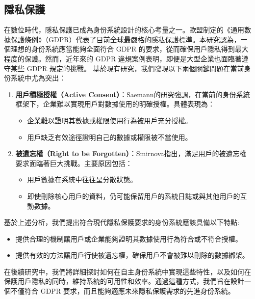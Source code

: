 \subsection{隱私保護}
在數位時代，隱私保護已成為身份系統設計的核心考量之一。歐盟制定的《通用數據保護條例》（GDPR）代表了目前全球最嚴格的隱私保護標準。本研究認為，一個理想的身份系統應當能夠全面符合 GDPR 的要求，從而確保用戶隱私得到最大程度的保護。然而，近年來的 GDPR 違規案例表明，即便是大型企業也面臨著遵守某些 GDPR 規定的挑戰。
基於現有研究，我們發現以下兩個關鍵問題在當前身份系統中尤為突出：
\begin{enumerate}
  \item \textbf{用戶積極授權（Active Consent）}：Saemann\cite{saemann2022investigating}的研究強調，在當前的身份系統框架下，企業難以實現用戶對數據使用的明確授權。具體表現為：
        \begin{itemize}
          \item 企業難以證明其數據或權限使用行為被用戶充分授權。
          \item 用戶缺乏有效途徑證明自己的數據或權限被不當使用。
        \end{itemize}
  \item \textbf{被遺忘權（Right to be Forgotten）}：Smirnova\cite{smirnova2024understanding}指出，滿足用戶的被遺忘權要求面臨著巨大挑戰。主要原因包括：
        \begin{itemize}
          \item 用戶數據在系統中往往呈分散狀態。
          \item 即使刪除核心用戶的資料，仍可能保留用戶的系統日誌或與其他用戶的互動數據。
        \end{itemize}
\end{enumerate}
基於上述分析，我們提出符合現代隱私保護要求的身份系統應該具備以下特點:
\begin{itemize}
  \item 提供合理的機制讓用戶或企業能夠證明其數據使用行為符合或不符合授權。
  \item 提供有效的方法讓用戶行使被遺忘權，確保用戶不會被難以刪除的數據綁架。
\end{itemize}
在後續研究中，我們將詳細探討如何在自主身份系統中實現這些特性，以及如何在保護用戶隱私的同時，維持系統的可用性和效率。通過這種方式，我們旨在設計一個不僅符合 GDPR 要求，而且能夠適應未來隱私保護需求的先進身份系統。
